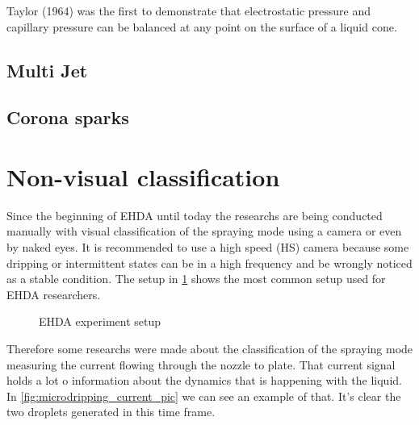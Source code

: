 Taylor (1964) was the first to demonstrate that electrostatic pressure and capillary pressure can be balanced at any point on the surface of a liquid cone. 

\subsection{Multi Jet}
\label{subsec:Multi Jet}

\subsection{Corona sparks}
\label{subsec:Corona sparks}


\section{Non-visual classification}
\label{sec:non-visual-classification}

Since the beginning of EHDA until today the researchs are being conducted manually with visual classification of the spraying mode using a camera or even by naked eyes.
It is recommended to use a high speed (HS) camera because some dripping or intermittent states can be in a high frequency and be wrongly noticed as a stable condition.
The setup in \ref{fig:ehda_setup} shows the most common setup used for EHDA researchers.

\begin{figure}[H]
  \centering
  \caption{EHDA experiment setup \cite{Luewton}}
  \label{fig:ehda_setup}
\end{figure}


Therefore some researchs were made about the classification of the spraying mode measuring the current flowing through the nozzle to plate\cite{Sjaaks}\cite{Chen_Pui}. That current signal holds a lot o information 
about the dynamics that is happening with the liquid. In \ref{fig:microdripping_current_pic} we can see an example of that. It's clear the two droplets generated in this time frame.


